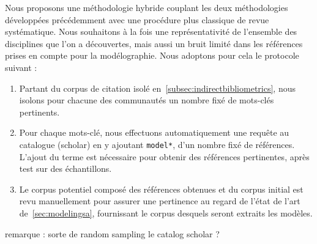 Nous proposons une méthodologie hybride couplant les deux méthodologies développées précédemment avec une procédure plus classique de revue systématique. Nous souhaitons à la fois une représentativité de l'ensemble des disciplines que l'on a découvertes, mais aussi un bruit limité dans les références prises en compte pour la modélographie. Nous adoptons pour cela le protocole suivant :

%
%  
%
% 


\begin{enumerate}
\item Partant du corpus de citation isolé en~\ref{subsec:indirectbibliometrics}, nous isolons pour chacune des communautés un nombre fixé de mots-clés pertinents.
\item Pour chaque mots-clé, nous effectuons automatiquement une requête au catalogue (scholar) en y ajoutant \texttt{model*}, d'un nombre fixé de références. L'ajout du terme est nécessaire pour obtenir des références pertinentes, après test sur des échantillons.
\item Le corpus potentiel composé des références obtenues et du corpus initial est revu manuellement pour assurer une pertinence au regard de l'état de l'art de~\ref{sec:modelingsa}, fournissant le corpus desquels seront extraits les modèles.
\end{enumerate}

remarque : sorte de random sampling le catalog scholar ?

